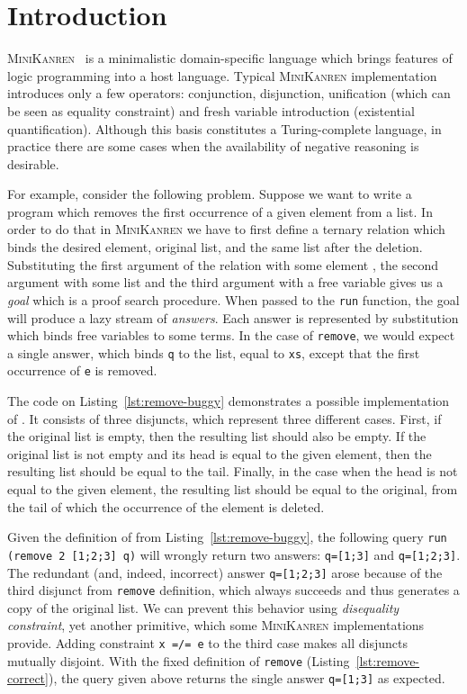 \section{Introduction}

\label{sec:intro}

\textsc{MiniKanren}~\cite{TheReasonedSchemer, byrd2010relational} is a minimalistic domain-specific language which brings 
features of logic programming into a host language.
Typical \textsc{MiniKanren} implementation introduces only a few operators:
conjunction, disjunction, unification (which can be seen as equality constraint) 
and fresh variable introduction (existential quantification).
Although this basis constitutes a Turing-complete language,
in practice there are some cases when 
the availability of negative reasoning is desirable.

For example, consider the following problem.
Suppose we want to write a program 
which removes the first occurrence of a given element from a list.
In order to do that in \textsc{MiniKanren} 
we have to first define a ternary relation  
which binds the desired element, original list, 
and the same list after the deletion. 
Substituting the first argument of the relation with some element , 
the second argument with some list  and 
the third argument with a free variable 
gives us a \emph{goal} which is a proof search procedure.
When passed to the \lstinline{run} function, 
the goal will produce a lazy stream of \emph{answers}.
Each answer is represented by substitution 
which binds free variables to some terms.
In the case of \lstinline{remove}, 
we would expect a single answer,
which binds \lstinline{q} to the list, 
equal to \lstinline{xs}, 
except that the first occurrence of \lstinline{e} 
is removed.

The code on Listing~\ref{lst:remove-buggy} demonstrates
a possible implementation of .
It consists of three disjuncts, which represent three different cases.
First, if the original list is empty, 
then the resulting list should also be empty.
If the original list is not empty and its head 
is equal to the given element, 
then the resulting list should be equal to the tail.
Finally, in the case when the head is not equal to the given element,
the resulting list should be equal to the original, 
from the tail of which the occurrence of the element  is deleted.

Given the definition of  from Listing~\ref{lst:remove-buggy},
the following query \lstinline{run (remove 2 [1;2;3] q)} will
wrongly return two answers: \lstinline{q=[1;3]} and \lstinline{q=[1;2;3]}.
The redundant (and, indeed, incorrect) answer \lstinline{q=[1;2;3]}
arose because of the third disjunct from \lstinline{remove} definition,
which always succeeds and thus generates a copy of the original list.
We can prevent this behavior using \emph{disequality constraint},
yet another primitive, which some \textsc{MiniKanren} implementations provide.
Adding constraint \lstinline{x =/= e} to the third case 
makes all disjuncts mutually disjoint. 
With the fixed definition of \lstinline{remove} (Listing~\ref{lst:remove-correct}), 
the query given above returns the single answer \lstinline{q=[1;3]} as expected. 

